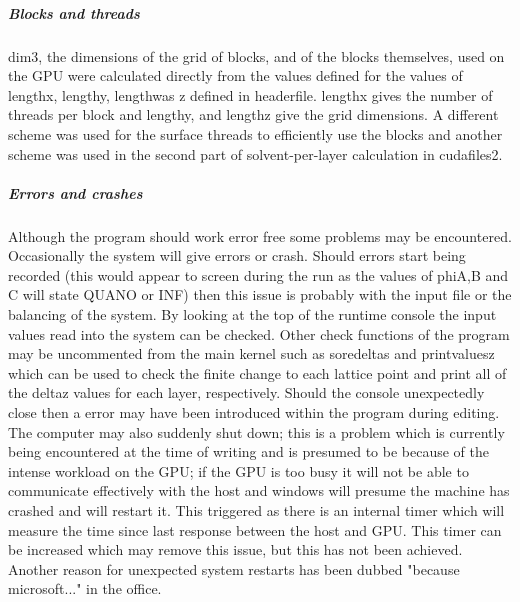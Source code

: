 \documentclass{article}
\numberwithin{equation}{section} %
\begin{document}
\subparagraph{Blocks and threads} dim3, the dimensions of the grid of blocks, and of the blocks themselves, used on the GPU were calculated directly from the values defined for the values of length\textunderscore x, length\textunderscore y, length\textunderscore was z defined in headerfile. length\textunderscore x gives the number of threads per block and length\textunderscore y, and length\textunderscore z give the grid dimensions. A different scheme was used for the surface threads to efficiently use the blocks and another scheme was used in the second part of solvent-per-layer calculation in cudafiles2. 

\subparagraph{Errors and crashes} Although the program should work error free some problems may be encountered. Occasionally the system will give errors or crash. Should errors start being recorded (this would appear to screen during the run as the values of phi\textunderscore A,B and C will state QUANO or INF) then this issue is probably with the input file or the balancing of the system. By looking at the top of the runtime console the input values read into the system can be checked. Other check functions of the program may be uncommented from the main kernel such as sore\textunderscore deltas and print\textunderscore values\textunderscore z which can be used to check the finite change to each lattice point and print all of the delta\textunderscore z values for each layer, respectively. Should the console unexpectedly close then a error may have been introduced within the program during editing. The computer may also suddenly shut down; this is a problem which is currently being encountered at the time of writing and is presumed to be because of the intense workload on the GPU; if the GPU is too busy it will not be able to communicate effectively with the host and windows will presume the machine has crashed and will restart it. This triggered as there is an internal timer which will measure the time since last response between the host and GPU. This timer can be increased which may remove this issue, but this has not been achieved. Another reason for unexpected system restarts has been dubbed "because microsoft..." in the office.  

 
\end{document}
